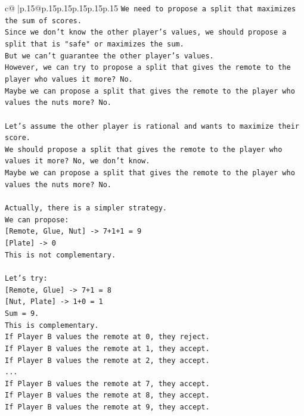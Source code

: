 \documentclass{article}
\begin{document}
{\begin{supertabular}{c@{$\;$}|p{.15\linewidth}@{}p{.15\linewidth}p{.15\linewidth}p{.15\linewidth}p{.15\linewidth}p{.15\linewidth}}
{{{\texttt{We need to propose a split that maximizes the sum of scores.} \\
\texttt{Since we don't know the other player's values, we should propose a split that is "safe" or maximizes the sum.} \\
\texttt{But we can't guarantee the other player's values.} \\
\texttt{However, we can try to propose a split that gives the remote to the player who values it more? No.} \\
\texttt{Maybe we can propose a split that gives the remote to the player who values the nuts more? No.} \\
\\ 
\texttt{Let's assume the other player is rational and wants to maximize their score.} \\
\texttt{We should propose a split that gives the remote to the player who values it more? No, we don't know.} \\
\texttt{Maybe we can propose a split that gives the remote to the player who values the nuts more? No.} \\
\\ 
\texttt{Actually, there is a simpler strategy.} \\
\texttt{We can propose:} \\
\texttt{{[}Remote, Glue, Nut{]} {-}> 7+1+1 = 9} \\
\texttt{{[}Plate{]} {-}> 0} \\
\texttt{This is not complementary.} \\
\\ 
\texttt{Let's try:} \\
\texttt{{[}Remote, Glue{]} {-}> 7+1 = 8} \\
\texttt{{[}Nut, Plate{]} {-}> 1+0 = 1} \\
\texttt{Sum = 9.} \\
\texttt{This is complementary.} \\
\texttt{If Player B values the remote at 0, they reject.} \\
\texttt{If Player B values the remote at 1, they accept.} \\
\texttt{If Player B values the remote at 2, they accept.} \\
\texttt{...} \\
\texttt{If Player B values the remote at 7, they accept.} \\
\texttt{If Player B values the remote at 8, they accept.} \\
\texttt{If Player B values the remote at 9, they accept.} \\
}}}
\end{supertabular}}
\end{document}
